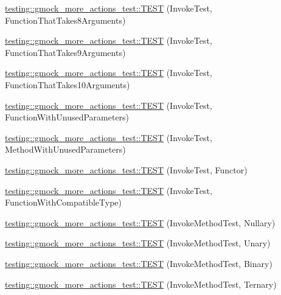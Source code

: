 \begin{DoxyCompactItemize}
\item 
\hyperlink{namespacetesting_1_1gmock__more__actions__test_a48d99224a323afa3c9772a868dd60214}{testing\+::gmock\+\_\+more\+\_\+actions\+\_\+test\+::\+T\+E\+ST} (Invoke\+Test, Function\+That\+Takes8\+Arguments)
\item 
\hyperlink{namespacetesting_1_1gmock__more__actions__test_a65d674aacb46d8bf79dbdfe0d49df442}{testing\+::gmock\+\_\+more\+\_\+actions\+\_\+test\+::\+T\+E\+ST} (Invoke\+Test, Function\+That\+Takes9\+Arguments)
\item 
\hyperlink{namespacetesting_1_1gmock__more__actions__test_a8939ea1ccb0d8787c926c92441b27f6c}{testing\+::gmock\+\_\+more\+\_\+actions\+\_\+test\+::\+T\+E\+ST} (Invoke\+Test, Function\+That\+Takes10\+Arguments)
\item 
\hyperlink{namespacetesting_1_1gmock__more__actions__test_a0dd6901e637db57c56f1cf8052b6e1bf}{testing\+::gmock\+\_\+more\+\_\+actions\+\_\+test\+::\+T\+E\+ST} (Invoke\+Test, Function\+With\+Unused\+Parameters)
\item 
\hyperlink{namespacetesting_1_1gmock__more__actions__test_a4f48af38351403b569fc6dfae7787ed2}{testing\+::gmock\+\_\+more\+\_\+actions\+\_\+test\+::\+T\+E\+ST} (Invoke\+Test, Method\+With\+Unused\+Parameters)
\item 
\hyperlink{namespacetesting_1_1gmock__more__actions__test_ac56a4cb164b338d3f388ed3f4306a5a5}{testing\+::gmock\+\_\+more\+\_\+actions\+\_\+test\+::\+T\+E\+ST} (Invoke\+Test, Functor)
\item 
\hyperlink{namespacetesting_1_1gmock__more__actions__test_af9dfd7f1d4186ee4de2d9871a19dba5a}{testing\+::gmock\+\_\+more\+\_\+actions\+\_\+test\+::\+T\+E\+ST} (Invoke\+Test, Function\+With\+Compatible\+Type)
\item 
\hyperlink{namespacetesting_1_1gmock__more__actions__test_abb046fd809977722720c9ce63afd7af5}{testing\+::gmock\+\_\+more\+\_\+actions\+\_\+test\+::\+T\+E\+ST} (Invoke\+Method\+Test, Nullary)
\item 
\hyperlink{namespacetesting_1_1gmock__more__actions__test_a386ce48f1f0a49e2b94a16deeffc2084}{testing\+::gmock\+\_\+more\+\_\+actions\+\_\+test\+::\+T\+E\+ST} (Invoke\+Method\+Test, Unary)
\item 
\hyperlink{namespacetesting_1_1gmock__more__actions__test_a86221fa7d09853358e38c01b0d6ceced}{testing\+::gmock\+\_\+more\+\_\+actions\+\_\+test\+::\+T\+E\+ST} (Invoke\+Method\+Test, Binary)
\item 
\hyperlink{namespacetesting_1_1gmock__more__actions__test_a2b98a8a68d37a0bec600227372a1cff8}{testing\+::gmock\+\_\+more\+\_\+actions\+\_\+test\+::\+T\+E\+ST} (Invoke\+Method\+Test, Ternary)

\end{DoxyCompactItemize}
